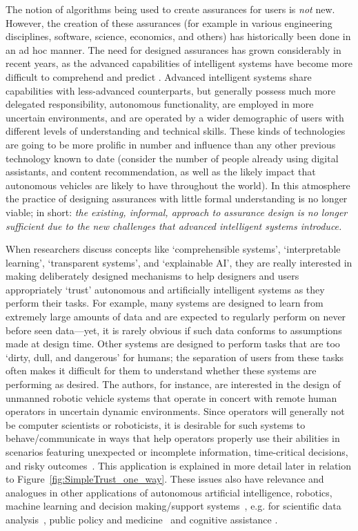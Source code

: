 The notion of algorithms being used to create assurances for users is \emph{not} new. However, the creation of these assurances (for example in various engineering disciplines, software, science, economics, and others) has historically been done in an ad hoc manner. The need for designed assurances has grown considerably in recent years, as the advanced capabilities of intelligent systems have become more difficult to comprehend and predict \cite{Doshi-Velez2017-xy, Weller2017-zx, Lipton2016-ug, Gunning2017-ih}. Advanced intelligent systems share capabilities with less-advanced counterparts, but generally possess much more delegated responsibility, autonomous functionality, are employed in more uncertain environments, and are operated by a wider demographic of users with different levels of understanding and technical skills. These kinds of technologies are going to be more prolific in number and influence than any other previous technology known to date (consider the number of people already using digital assistants, and content recommendation, as well as the likely impact that autonomous vehicles are likely to have throughout the world). In this atmosphere the practice of designing assurances with little formal understanding is no longer viable; in short: \emph{the existing, informal, approach to assurance design is no longer sufficient due to the new challenges that advanced intelligent systems introduce.}

When researchers discuss concepts like `comprehensible systems', `interpretable learning', `transparent systems', and `explainable AI', they are really interested in making deliberately designed mechanisms to help designers and users appropriately `trust' autonomous and artificially intelligent systems as they perform their tasks. 
For example, many systems are designed to learn from extremely large amounts of data and are expected to regularly perform on never before seen data---yet, it is rarely obvious if such data conforms to assumptions made at design time. 
Other systems are designed to perform tasks that are too `dirty, dull, and dangerous' for humans; the separation of users from these tasks often makes it difficult for them to understand whether these systems are performing as desired. 
The authors, for instance, are interested in the design of unmanned robotic vehicle systems that operate in concert with remote human operators in uncertain dynamic environments. 
Since operators will generally not be computer scientists or roboticists, it is desirable for such systems to behave/communicate in ways that help operators properly use their abilities in scenarios featuring unexpected or incomplete information, time-critical decisions, and risky outcomes~\cite{Hutchins2015-if, Sweet2016-tz}. 
This application is explained in more detail later in relation to Figure~\ref{fig:SimpleTrust_one_way}. 
These issues also have relevance and analogues in other applications of autonomous artificial intelligence, robotics, machine learning and decision making/support systems~\cite{Garcia2015-rs,Otte2013-oo,Sugiyama2013-ci,Amodei2016-xi}, e.g. for scientific data analysis~\cite{Faghmous2014-og}, public policy and medicine~\cite{Wagner2016-ck,Jovanovic2016-gw} and cognitive assistance \cite{Gutfreund2016-xe}.


